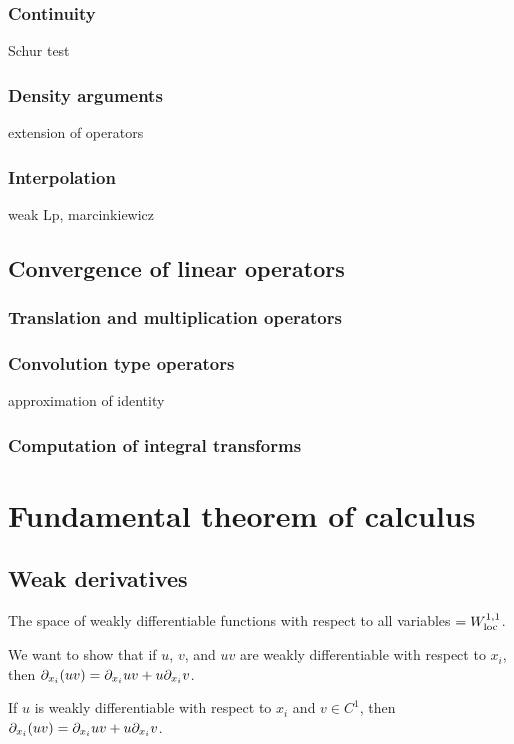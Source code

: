 \documentclass{../note}
\begin{document}
\section{Continuity}
Schur test

\section{Density arguments}
extension of operators

\section{Interpolation}
weak Lp, marcinkiewicz




\chapter{Convergence of linear operators}
\section{Translation and multiplication operators}

\section{Convolution type operators}
approximation of identity

\section{Computation of integral transforms}











\part{Fundamental theorem of calculus}

\chapter{Weak derivatives}

The space of weakly differentiable functions with respect to all variables $=W_{\mathrm{loc}}^{1,1}$.

\begin{prb}
We want to show that if $u$, $v$, and $uv$ are weakly differentiable with respect to $x_i$, then $\pd_{x_i}(uv)=\pd_{x_i}uv+u\pd_{x_i}v$.
\begin{parts}
\item If $u$ is weakly differentiable with respect to $x_i$ and $v\in C^1$, then $\pd_{x_i}(uv)=\pd_{x_i}uv+u\pd_{x_i}v$.
\end{parts}
\end{prb}
\end{document}
